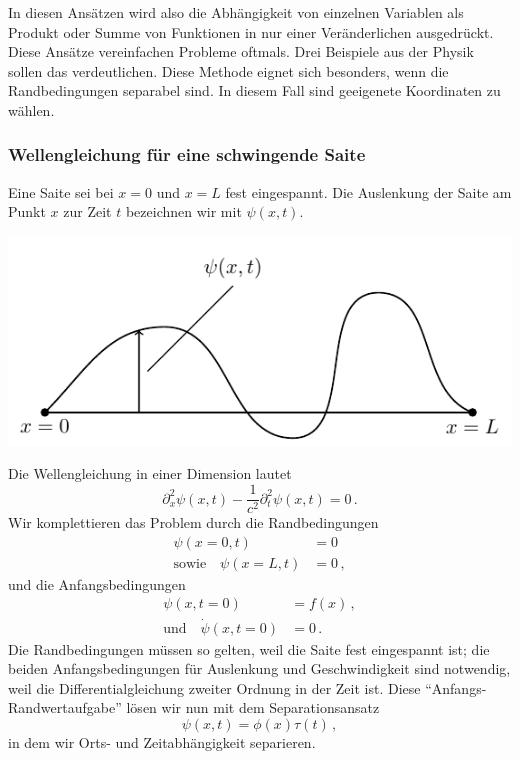 \documentclass[paper=a4, fontsize=11.0pt, abstractoff, DIV12]{scrartcl}
\begin{document}
In diesen Ansätzen wird also die Abhängigkeit von einzelnen Variablen als
Produkt oder Summe von Funktionen in nur einer Veränderlichen ausgedrückt.
Diese Ansätze vereinfachen Probleme oftmals. Drei Beispiele aus der Physik sollen das verdeutlichen. Diese Methode eignet sich besonders, wenn die
Randbedingungen separabel sind. In diesem Fall sind geeigenete Koordinaten zu
wählen.

\subsubsection{Wellengleichung für eine schwingende Saite}

Eine Saite sei bei $x=0$ und $x=L$ fest eingespannt. Die Auslenkung der
Saite am Punkt $x$ zur Zeit $t$ bezeichnen wir mit $\psi(x, t)$.

\begin{center}
    \includegraphics{Figures/Schwing}
\end{center}


Die Wellengleichung in einer Dimension lautet
\begin{equation}
\partial_x^2 \psi(x, t) - \frac{1}{c^2}\partial_t^2 \psi(x,t) = 0\,.
\end{equation}
Wir komplettieren das Problem durch die Randbedingungen
\begin{align}
\psi(x=0,t) &= 0\\
\text{sowie}\quad\psi(x=L,t) &= 0\,,
\end{align}
und die Anfangsbedingungen
\begin{align}
\psi(x,t=0) &= f(x)\, ,\label{eq:AB1}\\
\text{und}\quad\dot{\psi}(x,t=0) &= 0\,.
\end{align}
Die Randbedingungen müssen so gelten, weil die Saite fest eingespannt ist;
die beiden Anfangsbedingungen für Auslenkung und Geschwindigkeit sind
notwendig, weil die Differentialgleichung zweiter Ordnung in der Zeit ist.
Diese ``Anfangs-Randwertaufgabe'' lösen wir nun mit dem Separationsansatz
\begin{equation}
\psi(x,t) = \phi(x)\tau(t)\,,
\end{equation}
in dem wir Orts- und Zeitabhängigkeit separieren.
\end{document}
